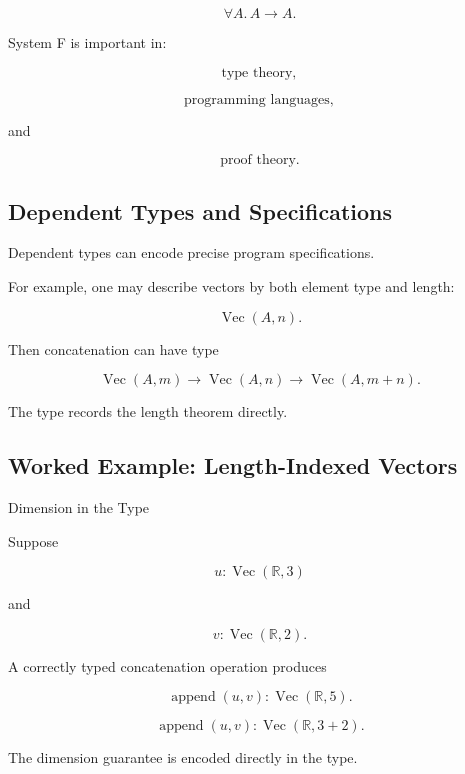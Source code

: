 \[
\boxed{
\forall A.\,A\to A.
}
\]

System F is important in:

\[
\boxed{
\text{type theory},
}
\]

\[
\boxed{
\text{programming languages},
}
\]

and

\[
\boxed{
\text{proof theory}.
}
\]

\subsection{Dependent Types and Specifications}
\label{subsec:dependent-types-specifications}

Dependent types can encode precise program specifications.

For example, one may describe vectors by both element type and length:

\[
\boxed{
\operatorname{Vec}(A,n).
}
\]

Then concatenation can have type

\[
\boxed{
\operatorname{Vec}(A,m)
\to
\operatorname{Vec}(A,n)
\to
\operatorname{Vec}(A,m+n).
}
\]

The type records the length theorem directly.

\subsection{Worked Example: Length-Indexed Vectors}
\label{subsec:worked-length-indexed-vectors}

\begin{workedexamplebox}{Dimension in the Type}

Suppose

\[
u:\operatorname{Vec}(\mathbb{R},3)
\]

and

\[
v:\operatorname{Vec}(\mathbb{R},2).
\]

A correctly typed concatenation operation produces

\[
\operatorname{append}(u,v)
:
\operatorname{Vec}(\mathbb{R},5).
\]

\begin{answerbox}
\[
\boxed{
\operatorname{append}(u,v)
:
\operatorname{Vec}(\mathbb{R},3+2).
}
\]
\end{answerbox}

The dimension guarantee is encoded directly in the type.

\end{workedexamplebox}

